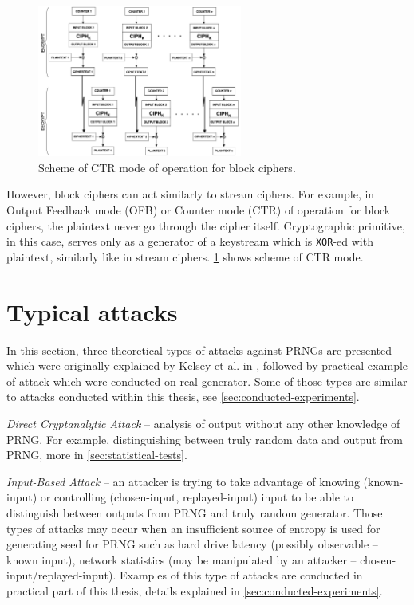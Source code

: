 \documentclass[
    digital,    %
    oneside,    %
    color,
    11pt,
    nocover,
    notable,
    nolof,
    nolot,
    final
]{fithesis3}
\renewcommand\_{\textunderscore\allowbreak}
\begin{document}
\begin{figure}[!h]
	\centering
	\includegraphics[width=0.6\textwidth]{./images/pictures/ctr.png}
	\caption{Scheme of CTR mode of operation for block ciphers. \cite{Dworkin:2001:SER:2206247}}
	\label{fig:ctr}
\end{figure}

However, block ciphers can act similarly to stream ciphers. For example, in Output Feedback mode (OFB) or Counter mode (CTR) of operation for block ciphers, the plaintext never go through the cipher itself. Cryptographic primitive, in this case, serves only as a generator of a keystream which is \texttt{XOR}-ed with plaintext, similarly like in stream ciphers. \cref{fig:ctr} shows scheme of CTR mode.\cite{Dworkin:2001:SER:2206247}

\section{Typical attacks}

In this section, three theoretical types of attacks against PRNGs are presented which were originally explained by Kelsey et al. in \cite{kelsey1998cryptanalytic}, followed by practical example of attack which were conducted on real generator. Some of those types are similar to attacks conducted within this thesis, see \cref{sec:conducted-experiments}.

\textit{Direct Cryptanalytic Attack} -- analysis of output without any other knowledge of PRNG. For example, distinguishing between truly random data and output from PRNG, more in \cref{sec:statistical-tests}.

\textit{Input-Based Attack} -- an attacker is trying to take advantage of knowing (known-input) or controlling (chosen-input, replayed-input) input to be able to distinguish between outputs from PRNG and truly random generator. Those types of attacks may occur when an insufficient source of entropy is used for generating seed for PRNG such as hard drive latency (possibly observable -- known input), network statistics (may be manipulated by an attacker -- chosen-input/replayed-input). Examples of this type of attacks are conducted in practical part of this thesis, details explained in \cref{sec:conducted-experiments}.
\end{document}
